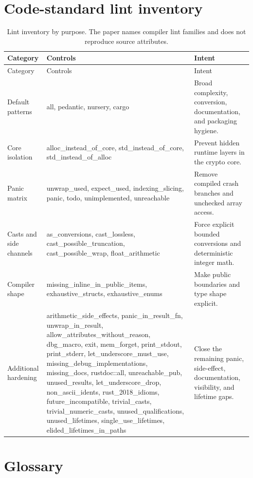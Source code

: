 \documentclass[11pt,a4paper]{article}
\theoremstyle{remark}
\begin{document}
\section{Code-standard lint inventory}

\begin{longtable}{@{}>{\raggedright\arraybackslash}p{3.4cm}>{\raggedright\arraybackslash}p{8.0cm}>{\raggedright\arraybackslash}p{3.4cm}@{}}
\caption{Lint inventory by purpose. The paper names compiler lint families and
does not reproduce source attributes.}\\
\toprule
Category & Controls & Intent\\
\midrule
\endfirsthead
\toprule
Category & Controls & Intent\\
\midrule
\endhead
Default patterns & all, pedantic, nursery, cargo & Broad complexity, conversion, documentation, and packaging hygiene.\\
Core isolation & alloc\_instead\_of\_core, std\_instead\_of\_core, std\_instead\_of\_alloc & Prevent hidden runtime layers in the crypto core.\\
Panic matrix & unwrap\_used, expect\_used, indexing\_slicing, panic, todo, unimplemented, unreachable & Remove compiled crash branches and unchecked array access.\\
Casts and side channels & as\_conversions, cast\_lossless, cast\_possible\_truncation, cast\_possible\_wrap, float\_arithmetic & Force explicit bounded conversions and deterministic integer math.\\
Compiler shape & missing\_inline\_in\_public\_items, exhaustive\_structs, exhaustive\_enums & Make public boundaries and type shape explicit.\\
Additional hardening & arithmetic\_side\_effects, panic\_in\_result\_fn, unwrap\_in\_result, allow\_attributes\_without\_reason, dbg\_macro, exit, mem\_forget, print\_stdout, print\_stderr, let\_underscore\_must\_use, missing\_debug\_implementations, missing\_docs, rustdoc::all, unreachable\_pub, unused\_results, let\_underscore\_drop, non\_ascii\_idents, rust\_2018\_idioms, future\_incompatible, trivial\_casts, trivial\_numeric\_casts, unused\_qualifications, unused\_lifetimes, single\_use\_lifetimes, elided\_lifetimes\_in\_paths & Close the remaining panic, side-effect, documentation, visibility, and lifetime gaps.\\
\bottomrule
\end{longtable}

\section{Glossary}
\end{document}
